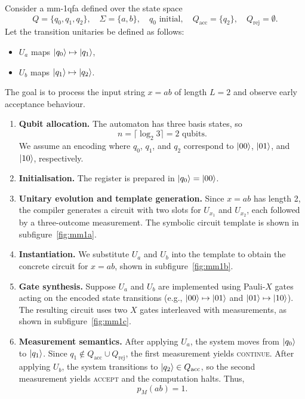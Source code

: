 \begin{example}[Early Acceptance on $x = ab$] \label{ex:mmqfa-early-accept}
Consider a \gls{mm-1qfa} defined over the state space
\[
Q = \{q_0, q_1, q_2\}, \quad \Sigma = \{a, b\}, \quad q_0 \text{ initial}, \quad Q_{\text{acc}} = \{q_2\}, \quad Q_{\text{rej}} = \emptyset.
\]
Let the transition unitaries be defined as follows:
\begin{itemize}
  \item $U_a$ maps $\ket{q_0} \mapsto \ket{q_1}$,
  \item $U_b$ maps $\ket{q_1} \mapsto \ket{q_2}$.
\end{itemize}
The goal is to process the input string $x = ab$ of length $L = 2$ and observe early acceptance behaviour.

\begin{enumerate}
  \item \textbf{Qubit allocation.} The automaton has three basis states, so
  \[
  n = \lceil \log_2 3 \rceil = 2 \text{ qubits}.
  \]
  We assume an encoding where $q_0$, $q_1$, and $q_2$ correspond to $\ket{00}$, $\ket{01}$, and $\ket{10}$, respectively.

  \item \textbf{Initialisation.} The register is prepared in $\ket{q_0} = \ket{00}$.

  \item \textbf{Unitary evolution and template generation.} Since $x = ab$ has length 2, the compiler generates a circuit with two slots for $U_{x_1}$ and $U_{x_2}$, each followed by a three-outcome measurement. The symbolic circuit template is shown in subfigure~\ref{fig:mm1a}.

  \item \textbf{Instantiation.} We substitute $U_a$ and $U_b$ into the template to obtain the concrete circuit for $x = ab$, shown in subfigure~\ref{fig:mm1b}.

  \item \textbf{Gate synthesis.} Suppose $U_a$ and $U_b$ are implemented using Pauli-$X$ gates acting on the encoded state transitions (e.g., $\ket{00} \mapsto \ket{01}$ and $\ket{01} \mapsto \ket{10}$). The resulting circuit uses two $X$ gates interleaved with measurements, as shown in subfigure~\ref{fig:mm1c}.

  \item \textbf{Measurement semantics.} After applying $U_a$, the system moves from $\ket{q_0}$ to $\ket{q_1}$. Since $q_1 \notin Q_{\text{acc}} \cup Q_{\text{rej}}$, the first measurement yields \textsc{continue}. After applying $U_b$, the system transitions to $\ket{q_2} \in Q_{\text{acc}}$, so the second measurement yields \textsc{accept} and the computation halts. Thus,
  \[
  p_M(ab) = 1.
  \]
\end{enumerate}
\vspace{1em}
\begin{figure}[H]
\centering


\end{figure}
\end{example}

